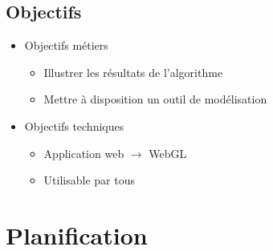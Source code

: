 \documentclass[xcolor=dvipsnames]{beamer}
\begin{document}
	\subsection{Objectifs}
	\begin{frame}{\subsecname}
		\begin{itemize}
			\item Objectifs métiers
			\begin{itemize}
				\item Illustrer les r\'esultats de l'algorithme
				\item Mettre \`a disposition un outil de mod\'elisation
			\end{itemize}
		\end{itemize}
		\begin{itemize}
			\item Objectifs techniques
			\begin{itemize}
				\item Application web $\to$ WebGL
				\item Utilisable par tous
			\end{itemize}
		\end{itemize}
	\end{frame}




\section{Planification}

\end{document}

